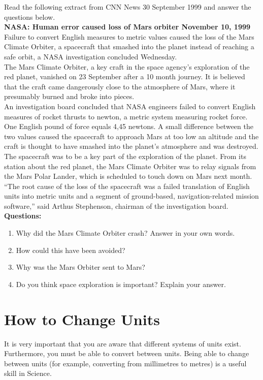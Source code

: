 \documentclass[10pt,a4paper,titlepage,twoside,openright]{report}
\begin{document}
{Read the following extract from CNN News 30 September 1999 and answer the questions below.\\

{\bf NASA: Human error caused loss of Mars orbiter November 10, 1999}\\

Failure to convert English measures to metric values caused the loss of the Mars Climate Orbiter, a spacecraft that smashed into the planet instead of reaching a safe orbit, a NASA investigation concluded Wednesday.\\
The Mars Climate Orbiter, a key craft in the space agency's exploration of the red planet, vanished on 23 September after a 10 month journey. It is believed that the craft came dangerously close to the atmosphere of Mars, where it presumably burned and broke into pieces.\\
An investigation board concluded that NASA engineers failed to convert English measures of rocket thrusts to newton, a metric system measuring rocket force. One English pound of force equals 4,45 newtons. A small difference between the two values caused the spacecraft to approach Mars at too low an altitude and the craft is thought to have smashed into the planet's atmosphere and was destroyed.\\
The spacecraft was to be a key part of the exploration of the planet. From its station about the red planet, the Mars Climate Orbiter was to relay signals from the Mars Polar Lander, which is scheduled to touch down on Mars next month.\\
``The root cause of the loss of the spacecraft was a failed translation of English units into metric units and a segment of ground-based, navigation-related mission software,'' said Arthus Stephenson, chairman of the investigation board.\\
{\bf Questions:}
\begin{enumerate}
\item{Why did the Mars Climate Orbiter crash? Answer in your own words.}
\item{How could this have been avoided?}
\item{Why was the Mars Orbiter sent to Mars?}
\item{Do you think space exploration is important? Explain your answer.}
\end{enumerate}
}

\section{How to Change Units}
It is very important that you are aware that different systems of units exist. Furthermore, you must be able to convert between units. Being able to change between units (for example, converting from millimetres to metres) is a useful skill in Science.
\end{document}
